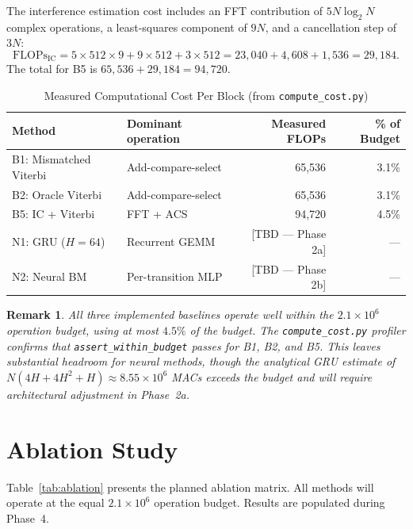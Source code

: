 \documentclass[11pt,a4paper]{article}
\newtheorem{remark}{Remark}[section]
\begin{document}
The interference estimation cost includes an FFT contribution of $5 N\log_2 N$ complex operations, a least-squares component of $9N$, and a cancellation step of $3N$:
\begin{equation}
  \text{FLOPs}_{\text{IC}} = 5 \times 512 \times 9 + 9 \times 512 + 3 \times 512 = 23{,}040 + 4{,}608 + 1{,}536 = 29{,}184.
\end{equation}
The total for B5 is $65{,}536 + 29{,}184 = 94{,}720$.

\begin{table}[h]
\centering
\caption{Measured Computational Cost Per Block (from \texttt{compute\_cost.py})}
\label{tab:compute}
\begin{tabular}{@{}llrr@{}}
\toprule
\textbf{Method} & \textbf{Dominant operation} & \textbf{Measured FLOPs} & \textbf{\% of Budget} \\
\midrule
B1: Mismatched Viterbi & Add-compare-select      & 65,536  & 3.1\% \\
B2: Oracle Viterbi     & Add-compare-select      & 65,536  & 3.1\% \\
B5: IC + Viterbi       & FFT + ACS               & 94,720  & 4.5\% \\
N1: GRU ($H=64$)       & Recurrent GEMM          & [TBD --- Phase 2a] & --- \\
N2: Neural BM          & Per-transition MLP       & [TBD --- Phase 2b] & --- \\
\bottomrule
\end{tabular}
\end{table}

\begin{remark}
All three implemented baselines operate well within the $2.1 \times 10^6$ operation budget, using at most $4.5\%$ of the budget. The \texttt{compute\_cost.py} profiler confirms that \texttt{assert\_within\_budget} passes for B1, B2, and B5. This leaves substantial headroom for neural methods, though the analytical GRU estimate of $N(4H + 4H^2 + H) \approx 8.55 \times 10^6$ MACs exceeds the budget and will require architectural adjustment in Phase~2a.
\end{remark}

\section{Ablation Study}

Table~\ref{tab:ablation} presents the planned ablation matrix. All methods will operate at the equal $2.1 \times 10^6$ operation budget. Results are populated during Phase~4.
\end{document}
